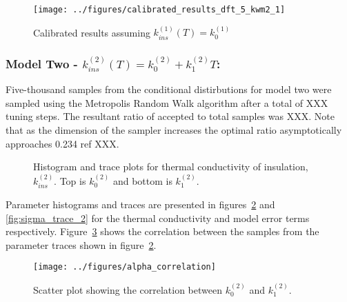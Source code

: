 \documentclass[article]{proc}
\begin{document}
        \begin{figure}[h!]
            \centering
            \texttt{[image: ../figures/calibrated\_results\_dft\_5\_kwm2\_1]}
            \caption{Calibrated results assuming $k^{(1)}_{ins}(T) = k^{(1)}_0$}
            \label{fig:cal_results_1}
        \end{figure}

        \subsubsection{Model Two - $k^{(2)}_{ins}(T) = k^{(2)}_0 + k^{(2)}_1 T$:}

        Five-thousand samples from the conditional distirbutions for model two were sampled using the Metropolis Random Walk algorithm after a total of XXX tuning steps. The resultant ratio of accepted to total samples was XXX. Note that as the dimension of the sampler increases the optimal ratio asymptotically approaches 0.234 ref XXX. 

        \begin{figure}[b!]
            \centering
            \qquad

            \qquad
            \caption{Histogram and trace plots for thermal conductivity of insulation, $k^{(2)}_{ins}$. Top is $k^{(2)}_0$ and bottom is $k^{(2)}_1$.}
            \label{fig:param_trace_2}
        \end{figure}

        Parameter histograms and traces are presented in figures~\ref{fig:param_trace_2} and \ref{fig:sigma_trace_2} for the thermal conductivity and model error terms respectively. Figure~\ref{fig:alpha_correlation} shows the correlation between the samples from the parameter traces shown in figure~\ref{fig:param_trace_2}. 

        \begin{figure}[h!]
            \centering
            \texttt{[image: ../figures/alpha\_correlation]}
            \caption{Scatter plot showing the correlation between $k^{(2)}_0$ and $k^{(2)}_1$.}
            \label{fig:alpha_correlation}
        \end{figure}
\end{document}
